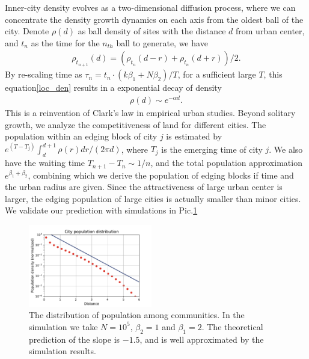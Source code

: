 \documentclass[reprint,unsortedaddress,amsmath,amssymb,aps,prl,fixfloat,showkeys]{revtex4-2}
\begin{document}

Inner-city density evolves as a two-dimensional diffusion process\cite{doi:10.1137/0150099}, where we can concentrate the density growth dynamics on each axis from the oldest ball of the city. Denote $\rho(d)$ as ball density of sites with the distance $d$ from urban center, and $t_n$ as the time for the $n_{th}$ ball to generate, we have \begin{align}\rho_{t_{n+1}}(d) = (\rho_{t_{n}}(d-r) + \rho_{t_{n}}(d+r) )/2.\label{loc_den}\end{align} By re-scaling time as $\tau_n = t_n\cdot (k\beta_1+N\beta_2)/T$, for a sufficient large $T$, this equation\@s\ref{loc_den} results in a exponential decay of density
    \begin{align}
        \rho(d)\sim e^{-\alpha d}\label{clark_eq}.
    \end{align}
This is a reinvention of Clark's law in empirical urban studies\cite{clark1951urban}. Beyond solitary growth, we analyze the competitiveness of land for different cities. The population within an edging block of city $j$ is estimated by $e^{(T-T_j)}\int_{d}^{d+1}\rho(r)dr/(2\pi d)$, where $T_j$ is the emerging time of city $j$. We also have the waiting time $T_{n+1}-T_{n}\sim 1/n$, and the total population approximation $e^{\beta_1+\beta_2}$, combining which we derive the population of edging blocks if time and the urban radius are given. Since the attractiveness of large urban center is larger, the edging population of large cities is actually smaller than minor cities. We validate our prediction with simulations in Pic.\@\ref{fig:clark} %

\begin{figure}
    \centering
    \includegraphics[width=0.48\textwidth]{pics/kernal_density.pdf}
    \caption{The distribution of population among communities. In the simulation we take $N = 10^5$, $\beta_2=1$ and $\beta_1 = 2$. The theoretical prediction of the slope is $-1.5$, and is well approximated by the simulation results.}
    \label{fig:clark}
\end{figure}
\end{document}

